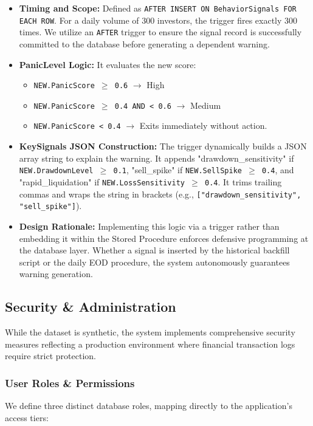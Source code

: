 \begin{itemize}
    \item \textbf{Timing and Scope:} Defined as \texttt{AFTER INSERT ON BehaviorSignals FOR EACH ROW}. For a daily volume of 300 investors, the trigger fires exactly 300 times. We utilize an \texttt{AFTER} trigger to ensure the signal record is successfully committed to the database before generating a dependent warning.
    \item \textbf{PanicLevel Logic:} It evaluates the new score:
        \begin{itemize}
            \item \texttt{NEW.PanicScore $\ge$ 0.6} $\rightarrow$ High
            \item \texttt{NEW.PanicScore $\ge$ 0.4 AND < 0.6} $\rightarrow$ Medium
            \item \texttt{NEW.PanicScore < 0.4} $\rightarrow$ Exits immediately without action.
        \end{itemize}
    \item \textbf{KeySignals JSON Construction:} The trigger dynamically builds a JSON array string to explain the warning. It appends "drawdown\_sensitivity" if \texttt{NEW.DrawdownLevel $\ge$ 0.1}, "sell\_spike" if \texttt{NEW.SellSpike $\ge$ 0.4}, and "rapid\_liquidation" if \texttt{NEW.LossSensitivity $\ge$ 0.4}. It trims trailing commas and wraps the string in brackets (e.g., \texttt{["drawdown\_sensitivity", "sell\_spike"]}).
    \item \textbf{Design Rationale:} Implementing this logic via a trigger rather than embedding it within the Stored Procedure enforces defensive programming at the database layer. Whether a signal is inserted by the historical backfill script or the daily EOD procedure, the system autonomously guarantees warning generation.
\end{itemize}

\subsection{Security \& Administration}
While the dataset is synthetic, the system implements comprehensive security measures reflecting a production environment where financial transaction logs require strict protection.

\subsubsection{User Roles \& Permissions}
We define three distinct database roles, mapping directly to the application's access tiers:

